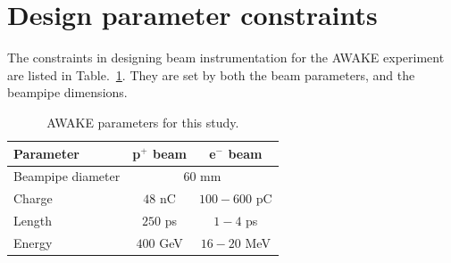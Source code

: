 





\section[Design parameter constraints]{Design parameter constraints}

The constraints in designing beam instrumentation for the AWAKE experiment are listed in Table.~\ref{awake_all_params:tab}. They are set by both the beam parameters, and the beampipe dimensions.

\begin{table}[t]
  \centering
    \begin{tabular}{l c c}
    \toprule
    Parameter & p$^+$ beam & e$^-$ beam\\
    \midrule
    Beampipe diameter & \multicolumn{2}{c}{$60$ mm}\\
    \hline \rule{0pt}{2.5ex}
    Charge 	    & $48$ nC	&  $100-600$ pC \\
    Length      & $250$ ps  &   $1-4$ ps\\
    Energy      & $400$ GeV   &   $16-20$ MeV\\
    \bottomrule
    \end{tabular}
  \caption{AWAKE parameters for this study.} \label{awake_all_params:tab}
\end{table}

